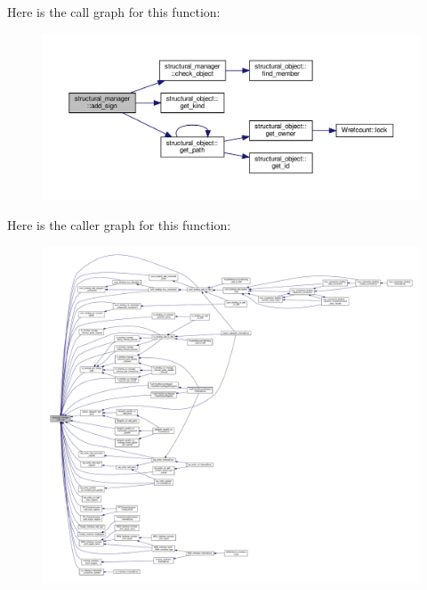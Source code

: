 Here is the call graph for this function\+:
\nopagebreak
\begin{figure}[H]
\begin{center}
\leavevmode
\includegraphics[width=350pt]{d7/d6b/classstructural__manager_a4a530daa9384ecd10119e11500bc3cd8_cgraph}
\end{center}
\end{figure}
Here is the caller graph for this function\+:
\nopagebreak
\begin{figure}[H]
\begin{center}
\leavevmode
\includegraphics[width=350pt]{d7/d6b/classstructural__manager_a4a530daa9384ecd10119e11500bc3cd8_icgraph}
\end{center}
\end{figure}
\mbox{\label{classstructural__manager_a822fbb21039617033cdaf45842738804}} 
